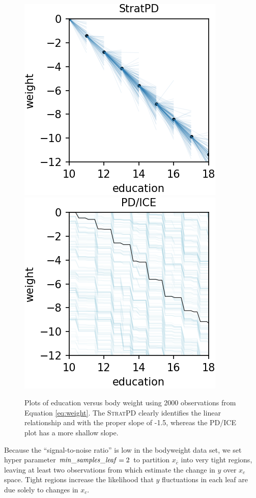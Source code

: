 \documentclass[12pt]{article}
\newcommand{\spd}{\fontfamily{cmr}\textsc{\small StratPD}}
\newcommand{\xnc}{$x_{\overline{c}}$}
\begin{document}
\begin{figure}[htbp]
\begin{center}
\includegraphics[scale=0.7]{images/education_vs_weight_stratpd.png}
\includegraphics[scale=0.7]{images/education_vs_weight_pdp.png}
\caption{Plots of education versus body weight using 2000 observations from Equation \eqref{eq:weight}. The \spd{} clearly identifies the linear relationship and with the proper slope of -1.5, whereas the PD/ICE plot has a more shallow slope.}
\label{fig:education_vs_weight}
\end{center}
\end{figure}

Because the ``signal-to-noise ratio'' is low in the bodyweight data set, we set hyper parameter ${\it min\_samples\_leaf}=2$ to partition \xnc{} into very tight regions, leaving at least two observations from which estimate the change in $y$ over $x_c$ space. Tight regions increase the likelihood that $y$ fluctuations in each leaf are due solely to changes in $x_c$.
\end{document}
